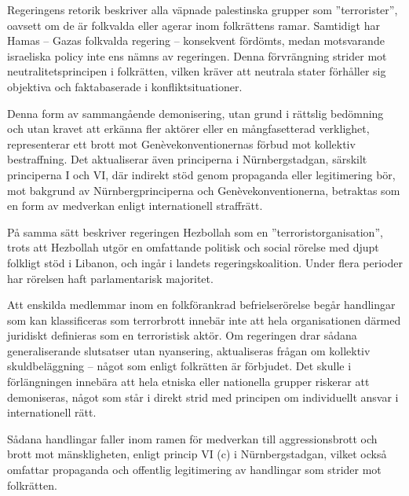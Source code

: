 Regeringens retorik beskriver alla väpnade palestinska grupper som ”terrorister”, oavsett om de är folkvalda eller 
agerar inom folkrättens ramar. Samtidigt har Hamas – Gazas folkvalda regering – konsekvent fördömts, medan motsvarande israeliska policy inte ens nämns av regeringen.
Denna förvrängning strider mot neutralitetsprincipen i folkrätten, vilken kräver att neutrala stater förhåller sig 
objektiva och faktabaserade i konfliktsituationer.

Denna form av sammangående demonisering, utan grund i rättslig bedömning och utan kravet att erkänna fler 
aktörer eller en mångfasetterad verklighet, representerar ett brott mot Genèvekonventionernas förbud mot kollektiv 
bestraffning. Det aktualiserar även principerna i Nürnbergstadgan, särskilt principerna I och VI, där indirekt stöd 
genom propaganda eller legitimering bör, mot bakgrund av Nürnbergprinciperna och Genèvekonventionerna, 
betraktas som en form av medverkan enligt internationell straffrätt.

På samma sätt beskriver regeringen Hezbollah som en ”terroristorganisation”, trots att Hezbollah utgör en omfattande 
politisk och social rörelse med djupt folkligt stöd i Libanon, och ingår i landets regeringskoalition. 
Under flera perioder har rörelsen haft parlamentarisk majoritet.

Att enskilda medlemmar inom en folkförankrad befrielserörelse begår handlingar som kan klassificeras som 
terrorbrott innebär inte att hela organisationen därmed juridiskt definieras som en terroristisk aktör. 
Om regeringen drar sådana generaliserande slutsatser utan nyansering, aktualiseras frågan om kollektiv skuldbeläggning – något 
som enligt folkrätten är förbjudet. Det skulle i förlängningen innebära att hela etniska eller nationella grupper 
riskerar att demoniseras, något som står i direkt strid med principen om individuellt ansvar i internationell rätt.

Sådana handlingar faller inom ramen för medverkan till aggressionsbrott och brott mot mänskligheten, enligt princip VI (c) i Nürnbergstadgan, 
vilket också omfattar propaganda och offentlig legitimering av handlingar som strider mot folkrätten.

